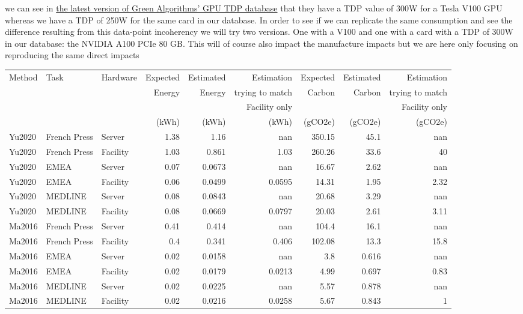 \documentclass[11pt]{article}
\begin{document}
we can see in \href{https://github.com/GreenAlgorithms/green-algorithms-tool/blob/master/data/latest/TDP\_gpu.csv}{the latest version of Green Algorithms' GPU TDP database}
that they have a TDP value of 300W for a Tesla V100 GPU whereas we
have a TDP of 250W for the same card in our database. In order to see
if we can replicate the same consumption and see the difference
resulting from this data-point incoherency we will try two
versions. One with a V100 and one with a card with a TDP
of 300W in our database: the NVIDIA A100 PCIe 80 GB. This will of
course also impact the manufacture impacts but we are here only focusing on
reproducing the same direct impacts

\begin{center}
\begin{tabular}{lllrrrrrr}
Method & Task & Hardware & Expected & Estimated & Estimation & Expected & Estimated & Estimation\\
 &  &  & Energy & Energy & trying to match & Carbon & Carbon & trying to match\\
 &  &  &  &  & Facility only &  &  & Facility only\\
 &  &  & (kWh) & (kWh) & (kWh) & (gCO2e) & (gCO2e) & (gCO2e)\\
\hline
Yu2020 & French Press & Server & 1.38 & 1.16 & nan & 350.15 & 45.1 & nan\\
Yu2020 & French Press & Facility & 1.03 & 0.861 & 1.03 & 260.26 & 33.6 & 40\\
Yu2020 & EMEA & Server & 0.07 & 0.0673 & nan & 16.67 & 2.62 & nan\\
Yu2020 & EMEA & Facility & 0.06 & 0.0499 & 0.0595 & 14.31 & 1.95 & 2.32\\
Yu2020 & MEDLINE & Server & 0.08 & 0.0843 & nan & 20.68 & 3.29 & nan\\
Yu2020 & MEDLINE & Facility & 0.08 & 0.0669 & 0.0797 & 20.03 & 2.61 & 3.11\\
Ma2016 & French Press & Server & 0.41 & 0.414 & nan & 104.4 & 16.1 & nan\\
Ma2016 & French Press & Facility & 0.4 & 0.341 & 0.406 & 102.08 & 13.3 & 15.8\\
Ma2016 & EMEA & Server & 0.02 & 0.0158 & nan & 3.8 & 0.616 & nan\\
Ma2016 & EMEA & Facility & 0.02 & 0.0179 & 0.0213 & 4.99 & 0.697 & 0.83\\
Ma2016 & MEDLINE & Server & 0.02 & 0.0225 & nan & 5.57 & 0.878 & nan\\
Ma2016 & MEDLINE & Facility & 0.02 & 0.0216 & 0.0258 & 5.67 & 0.843 & 1\\
\end{tabular}
\end{center}
\end{document}
